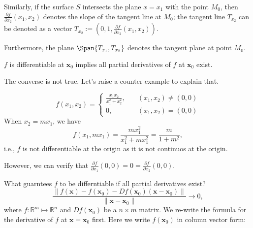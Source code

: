 Similarly, if the surface $S$ intersects the plane $x=x_1$  with the point $M_0$, then $\frac{\partial f}{\partial{x_2}}(x_1,x_2)$ denotes the slope of the tangent line at $M_0$; the tangent line $T_{x_2}$ can be denoted as a vector $T_{x_2}:=(0,1,\frac{\partial f}{\partial{x_2}}(x_1,x_2))$. 

Furthermore, the plane $\Span\{T_{x_1},T_{x_2}\}$ denotes the tangent plane at point $M_0$.
\begin{corollary}\label{Cor:9:1}
$f$ is differentiable at $\bm x_0$ implies all partial derivatives of $f$ at $\bm x_0$ exist.
\end{corollary}
The converse is not true. Let's raise a counter-example to explain that.
\begin{example}
\[
f(x_1,x_2)=\left\{
\begin{aligned}
\frac{x_1x_2}{x_1^2+x_2^2},&\quad (x_1,x_2)\ne(0,0)\\
0,&\quad (x_1,x_2)=(0,0)
\end{aligned}
\right.
\]
When $x_2=mx_1$, we have
\[
f(x_1,mx_1) = \frac{mx_1^2}{x_1^2+mx_1^2}=\frac{m}{1+m^2},
\]
i.e., $f$ is not differentiable at the origin as it is not continuos at the origin.

However, we can verify that $\frac{\partial f}{\partial x_1}(0,0)=0=\frac{\partial f}{\partial x_2}(0,0)$.

\end{example}
What guarntees $f$ to be differntiable if all partial derivatives exist?
\[
\frac{\|f(\bm x) - f(\bm x_0) - Df(\bm x_0)(\bm x-\bm x_0)\|}{\|\bm x-\bm x_0\|}\to0,
\]
where $f:\mathbb{R}^m\mapsto\mathbb{R}^n$ and $Df(\bm x_0)$ be a $n\times m$ matrix. We re-write the formula for the derivative of $f$ at $\bm x=\bm x_0$ first. Here we write $f(\bm x_0)$ in column vector form:
